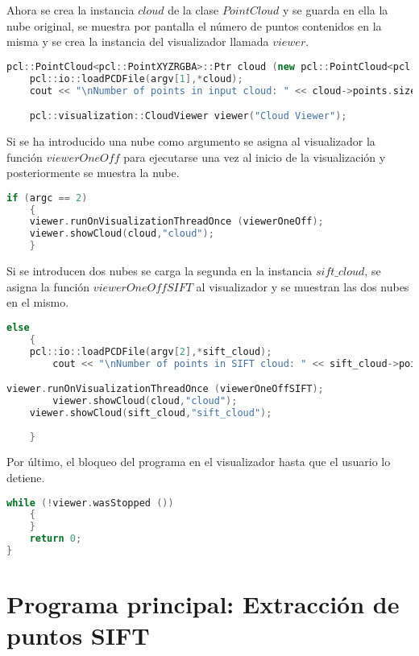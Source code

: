 Ahora se crea la instancia $cloud$ de la clase $PointCloud$ y se guarda en ella la nube original, se muestra por pantalla el número de puntos contenidos en la misma y se crea la instancia del visualizador llamada $viewer$.

\begin{lstlisting}[language=C++,breaklines]
pcl::PointCloud<pcl::PointXYZRGBA>::Ptr cloud (new pcl::PointCloud<pcl::PointXYZRGBA>); 
    pcl::io::loadPCDFile(argv[1],*cloud);
    cout << "\nNumber of points in input cloud: " << cloud->points.size() << "\n";

    pcl::visualization::CloudViewer viewer("Cloud Viewer");
\end{lstlisting}

Si se ha introducido una nube como argumento se asigna al visualizador la función $viewerOneOff$ para ejecutarse una vez al inicio de la visualización y posteriormente se muestra la nube.

\begin{lstlisting}[language=C++,breaklines]
if (argc == 2)
    {
	viewer.runOnVisualizationThreadOnce (viewerOneOff);
	viewer.showCloud(cloud,"cloud");
    }
\end{lstlisting}

Si se introducen dos nubes se carga la segunda en la instancia $sift\_cloud$, se asigna la función $viewerOneOffSIFT$ al visualizador y se muestran las dos nubes en el mismo.

\begin{lstlisting}[language=C++,breaklines]
else 
    {
	pcl::io::loadPCDFile(argv[2],*sift_cloud);
        cout << "\nNumber of points in SIFT cloud: " << sift_cloud->points.size() << "\n";

viewer.runOnVisualizationThreadOnce (viewerOneOffSIFT);
    	viewer.showCloud(cloud,"cloud");
   	viewer.showCloud(sift_cloud,"sift_cloud");
 
    }
\end{lstlisting}

Por último, el bloqueo del programa en el visualizador hasta que el usuario lo detiene.
\begin{lstlisting}[language=C++,breaklines]
   while (!viewer.wasStopped ())
    {
    }
    return 0;
}
\end{lstlisting}
\fi


\section{Programa principal: Extracción de puntos SIFT}
